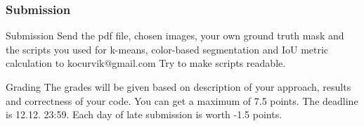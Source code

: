 \documentclass{beamer}
\begin{document}
\begin{frame}
\frametitle{Submission}
\begin{block}{Submission}
Send the pdf file, chosen images, your own ground truth mask and the scripts you used for k-means, color-based segmentation and IoU metric calculation to kocurvik@gmail.com Try to make scripts readable.
\end{block}

\begin{block}{Grading}
The grades will be given based on description of your approach, results and correctness of your code. You can get a maximum of 7.5 points. The deadline is 12.12. 23:59. Each day of late submission is worth -1.5 points.
\end{block}
\end{frame}
\end{document}
